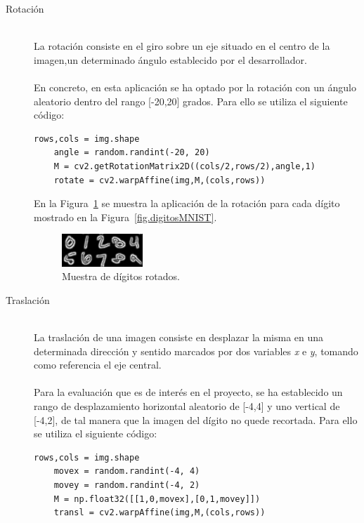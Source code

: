 \begin{description}
	\item[Rotación] \hfill 
	\vspace{5pt}
	\\
	La rotación consiste en el giro sobre un eje situado en el centro de la imagen,un determinado ángulo establecido por el desarrollador.\\
	\vspace{-10pt}
	\\
	En concreto, en esta aplicación se ha optado por la rotación con un ángulo aleatorio dentro del rango [-20,20] grados. Para ello se utiliza el siguiente código:
	\vspace{10pt}
	\begin{lstlisting}[frame=single]
	rows,cols = img.shape
	angle = random.randint(-20, 20)
	M = cv2.getRotationMatrix2D((cols/2,rows/2),angle,1)
	rotate = cv2.warpAffine(img,M,(cols,rows))
	\end{lstlisting}
	
	En la Figura~\ref{fig.rotacion} se muestra la aplicación de la rotación para cada dígito mostrado en la Figura~\ref{fig.digitosMNIST}.
	
	\begin{figure}[H]
		\begin{center}
			\includegraphics[width=0.3\textwidth]{figures/rotacion}
			\caption{Muestra de dígitos rotados.}
			\label{fig.rotacion}
		\end{center}
	\end{figure}
	\vspace{-10pt}
	\item[Traslación] \hfill 
	\vspace{10pt}
	\\
	La traslación de una imagen consiste en desplazar la misma en una determinada dirección y sentido marcados por dos variables \textit{x} e \textit{y}, tomando como referencia el eje central.\\
	\vspace{-10pt}
	\\
	Para la evaluación que es de interés en el proyecto, se ha establecido un rango de desplazamiento horizontal aleatorio de [-4,4] y uno vertical de [-4,2], de tal manera que la imagen del dígito no quede recortada. Para ello se utiliza el siguiente código:\\
	\begin{lstlisting}[frame=single]
	rows,cols = img.shape
	movex = random.randint(-4, 4)
	movey = random.randint(-4, 2)
	M = np.float32([[1,0,movex],[0,1,movey]])
	transl = cv2.warpAffine(img,M,(cols,rows))
	\end{lstlisting}
	

\end{description}
